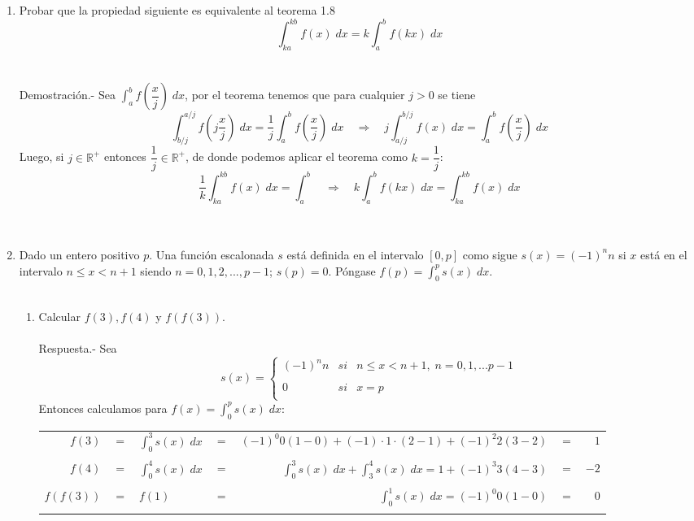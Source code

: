 \begin{enumerate}
    \item Probar que la propiedad siguiente es equivalente al teorema 1.8 $$\displaystyle\int_{ka}^{kb} f(x) \; dx = k \int_{a}^{b} f(kx) \; dx$$\\\\
	Demostración.-\; Sea $\displaystyle\int_{a}^{b} f\left(\dfrac{x}{j}\right) \; dx$, por el teorema tenemos que para cualquier $j>0$ se tiene $$\displaystyle\int_{b/j}^{a/j}f\left(j\dfrac{x}{j}\right)\; dx = \dfrac{1}{j} \int_{a}^{b} f \left(\dfrac{x}{j}\right) \; dx \quad \Rightarrow \quad j\int_{a/j}^{b/j} f(x) \; dx = \int_{a}^{b} f\left(\dfrac{x}{j} \right) \; dx$$ Luego, si $j \in \mathbb{R}^+$ entonces $\dfrac{1}{j}\in \mathbb{R}^+$, de donde podemos aplicar el teorema como $k=\dfrac{1}{j}$: $$\dfrac{1}{k}\displaystyle\int_{ka}^{kb} f(x)\; dx = \int_{a}^{b} \quad \Rightarrow \quad k \int_{a}^{b} f(kx) \; dx = \int_{ka}^{kb} f(x) \; dx$$\\\\

    \item Dado un entero positivo $p$. Una función escalonada $s$ está definida en el intervalo $[0,p]$ como sigue $s(x)=(-1)^n n$ si $x$ está en el intervalo $n\leq x < n+1$ siendo $n=0,1,2,...,p-1$; $s(p)=0$. Póngase $f(p)=\displaystyle\int_{0}^{p} s(x)\; dx.$\\\\

    \begin{enumerate}[\bfseries (a)]

	\item Calcular $f(3), f(4)$ y $f(f(3))$.\\\\
	    Respuesta.-\; Sea $$s(x) = \left\{ \begin{array}{lcl}
		(-1)^n n&si&n\leq x < n+1, \; n=0,1,...p-1\\
		\\0& si &x=p\\
	    \end{array}\right.$$
	    Entonces calculamos para $f(x)=\displaystyle\int_{0}^{p} s(x)\; dx$:
	    \begin{center}
	    \begin{tabular}{rclcrcr}
		$f(3)$ & $=$ & $\displaystyle\int_{0}^{3} s(x) \; dx$ & $=$ & $(-1)^0 0 (1-0) + (-1)\cdot 1\cdot(2-1) + (-1)^2 2 (3-2)$ & $=$ & $1$\\\\
		$f(4)$ & $=$ & $\displaystyle\int_{0}^{4} s(x) \; dx$ &$=$ & $\displaystyle\int_{0}^{3} s(x) \;dx + \int_{3}^{4} s(x) \; dx = 1 + (-1)^3 3 (4-3)$&$=$&$-2$\\\\
		$f(f(3))$&$=$&$f(1)$&$=$&$\displaystyle\int_{0}^{1} s(x) \; dx = (-1)^0 0 (1-0)$&$=$&$0$\\\\
	    \end{tabular}
	    \end{center}


\end{enumerate}
\end{enumerate}
